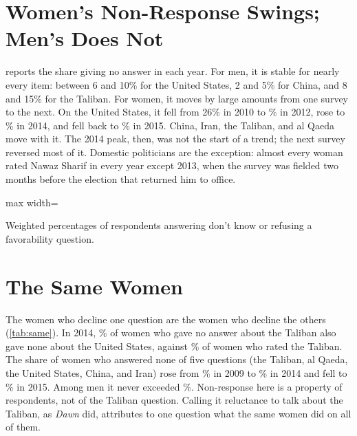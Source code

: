 \documentclass[11pt,letterpaper]{article}
\newcommand{\TableStyle}{\normalsize\setlength{\tabcolsep}{6pt}\renewcommand{\arraystretch}{1}}
\newcommand{\tablenote}[1]{\par\smallskip\begin{minipage}{\linewidth}\footnotesize #1\end{minipage}}
\begin{document}
\section{Women's Non-Response Swings; Men's Does Not}

 reports the share giving no answer in each year. For men, it is stable for nearly every item: between 6 and 10\% for the United States, 2 and 5\% for China, and 8 and 15\% for the Taliban. For women, it moves by large amounts from one survey to the next. On the United States, it fell from 26\% in 2010 to \WomenUSLow{}\% in 2012, rose to \WomenUS{}\% in 2014, and fell back to \WomenUSLast{}\% in 2015. China, Iran, the Taliban, and al Qaeda move with it. The 2014 peak, then, was not the start of a trend; the next survey reversed most of it. Domestic politicians are the exception: almost every woman rated Nawaz Sharif in every year except 2013, when the survey was fielded two months before the election that returned him to office.

\begin{table}[htbp]
\centering\TableStyle
\caption{Share giving no answer, Pakistan, by sex and year}
\label{tab:series}
\begin{adjustbox}{max width=\linewidth}

\end{adjustbox}
\tablenote{Weighted percentages of respondents answering don't know or refusing a favorability question.}
\end{table}

\section{The Same Women}

The women who decline one question are the women who decline the others (\cref{tab:same}). In 2014, \WomenUSIfTaliban{}\% of women who gave no answer about the Taliban also gave none about the United States, against \WomenUSIfAnswered{}\% of women who rated the Taliban. The share of women who answered none of five questions (the Taliban, al Qaeda, the United States, China, and Iran) rose from \WomenSkipAllOld{}\% in 2009 to \WomenSkipAll{}\% in 2014 and fell to \WomenSkipAllLast{}\% in 2015. Among men it never exceeded \MenSkipAllMax{}\%. Non-response here is a property of respondents, not of the Taliban question. Calling it reluctance to talk about the Taliban, as \textit{Dawn} did, attributes to one question what the same women did on all of them.
\end{document}
